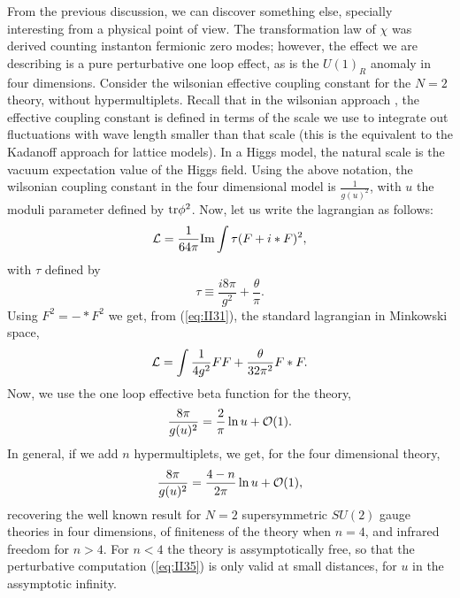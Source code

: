 From the previous discussion, we can discover something else,
specially interesting from a physical point of view. The 
transformation law of $\chi$ was derived counting instanton
fermionic zero modes; however, the effect we are
describing is a pure perturbative one loop effect, as is the
$U(1)_R$ anomaly in four dimensions. Consider 
the wilsonian \cite{Shifwils,Sbeta} effective coupling
constant for the $N\!=\!2$ theory, without hypermultiplets.
Recall that in the wilsonian approach \cite{Wilson}, the effective coupling
constant is defined in terms of the scale we use to
integrate out fluctuations with wave length smaller than that
scale (this is the equivalent to the Kadanoff approach for
lattice models). In a Higgs model, the natural scale is the vacuum
expectation value of the Higgs field. Using the above notation,
the wilsonian coupling constant in the four dimensional model is
$\frac {1}{g(u)^2}$, with $u$ the moduli parameter defined by
$\hbox {tr} \phi^2$. Now, let us write the lagrangian as follows:
\begin{equation}
{\cal L} = \frac {1}{64 \pi} \hbox {Im} \int \tau (F+i*F)^2,
\label{eq:II31}
\end{equation}
with $\tau$ defined by
\begin{equation}
\tau \equiv \frac {i 8 \pi}{g^2} + \frac {\theta}{\pi}.
\label{eq:II32}
\end{equation}
Using $F^2= -*F^2$ we get, from (\ref{eq:II31}), the standard
lagrangian in Minkowski space,
\begin{equation}
{\cal L} = \int \frac {1}{4g^2} FF + \frac {\theta}{32 \pi^2} F*F.
\label{eq:II33}
\end{equation}
Now, we use the one loop effective beta function for the
theory,
\begin{equation}
\frac {8\pi}{g(u)^2} = \frac {2}{\pi} \ln u + {\cal O}(1).
\label{eq:II34}
\end{equation}
In general, if we add $n$ hypermultiplets, we get, for the four
dimensional theory,
\begin{equation}
\frac {8\pi}{g(u)^2} = \frac {4-n}{2\pi} \ln u + {\cal O}(1),
\label{eq:II35}
\end{equation}
recovering the well known result for $N\!=\!2$ supersymmetric
$SU(2)$ gauge theories in four dimensions,
of finiteness of the theory when $n=4$, and infrared freedom for $n>4$. For
$n<4$ the theory is assymptotically free, so that
the perturbative computation (\ref{eq:II35}) is only valid at 
small distances, for $u$ in the assymptotic infinity. 
  
